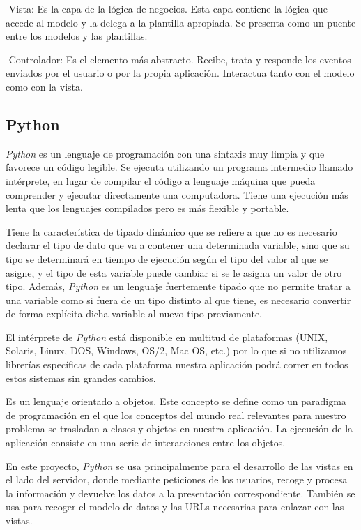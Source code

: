 \documentclass[a4paper, 12pt]{book}
\begin{document}
-Vista: Es la capa de la l\'ogica de negocios. Esta capa contiene la l\'ogica que accede al modelo y la delega a la plantilla apropiada. Se presenta 
como un puente entre los modelos y las plantillas.

-Controlador: Es el elemento m\'as abstracto. Recibe, trata y responde los eventos enviados por el usuario o por la propia aplicaci\'on. Interactua 
tanto con el modelo como con la vista.



\subsection{Python} 
\label{subsec:python}
\textit{Python} es un lenguaje de programaci\'on con una sintaxis muy limpia y que favorece un c\'odigo legible. Se ejecuta utilizando un programa intermedio 
llamado int\'erprete, en lugar de compilar el c\'odigo a lenguaje m\'aquina que pueda comprender
y ejecutar directamente una computadora. Tiene una ejecuci\'on m\'as lenta que los lenguajes compilados pero es m\'as flexible y portable.

Tiene la caracter\'istica de tipado din\'amico que se refiere a que no es necesario declarar el tipo de dato que va a contener una determinada 
variable, sino que su tipo se determinar\'a en tiempo de ejecuci\'on seg\'un el tipo del valor al que se asigne, y el tipo de esta variable puede 
cambiar si se le asigna un valor de otro tipo. Adem\'as, \textit{Python} es un lenguaje fuertemente tipado que no permite tratar a una variable como si fuera 
de un tipo distinto al que tiene, es necesario convertir de forma expl\'icita dicha variable al nuevo tipo previamente. 

El int\'erprete de \textit{Python} est\'a disponible en multitud de plataformas (UNIX, Solaris, Linux, DOS, Windows, OS/2, Mac OS, etc.) 
por lo que si no utilizamos librer\'ias espec\'ificas de cada plataforma nuestra aplicaci\'on podr\'a correr en todos estos sistemas sin grandes 
cambios.

Es un lenguaje orientado a objetos. Este concepto se define como un paradigma de programaci\'on en el que los conceptos del mundo real relevantes 
para nuestro problema se trasladan a clases y objetos en nuestra aplicaci\'on. La ejecuci\'on de la aplicaci\'on consiste en una serie de interacciones 
entre los objetos.

En este proyecto, \textit{Python} se usa principalmente para el desarrollo de las vistas en el lado del servidor, donde mediante 
peticiones de los usuarios, recoge y procesa la informaci\'on y devuelve los datos a la presentaci\'on correspondiente. Tambi\'en se usa para recoger el 
modelo de datos y las URLs necesarias para enlazar con las vistas.
\end{document}
